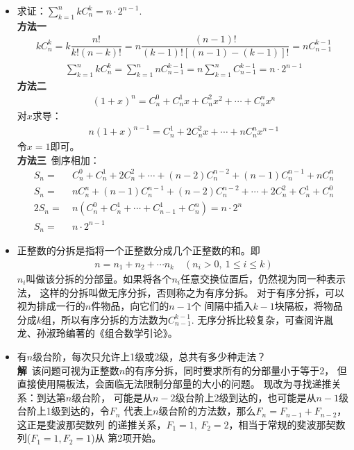 \begin{itemize}[leftmargin=\inteval{\myitemleftmargin}pt,itemsep=
   \inteval{\myitemitempsep}pt,topsep=\inteval{\myitemtopsep}pt]
\item 求证：$ \sum\limits_{k=1}^{n} kC_n^k=n\cdot2^{n-1} $. \\
\textbf{方法一} 
\begin{gather*}
    kC_n^k=k\dfrac{n!}{k!(n-k)!}=n\dfrac{(n-1)!}{(k-1)![(n-1)-(k-1)]!}=nC_{n-1}^{k-1} 	
\end{gather*}
\begin{gather*}
    \sum_{k=1}^{n} kC_n^k=\sum_{k=1}^{n} nC_{n-1}^{k-1}=n\sum_{k=1}^{n} C_{n-1}^{k-1}
    =n\cdot 2^{n-1}
\end{gather*}
\textbf{方法二}
\begin{align*}
    (1+x)^n=C_n^0+C_n^1x+C_n^2x^2+\cdots + C_n^nx^n
\end{align*}
对$ x $求导：
\begin{align} \label{二项展开式两边求导}
    n(1+x)^{n-1}=C_n^1+2C_n^2x+\cdots + nC_n^nx^{n-1}
\end{align}
令$ x=1 $即可。\\
\textbf{方法三}\ 倒序相加：
\begin{align*}
    S_n=&\ C_n^0+C_n^1+2C_n^2+\cdots+(n-2)C_n^{n-2} +(n-1)C_n^{n-1}+ nC_n^n \\
    S_n=&\ nC_n^n+(n-1)C_n^{n-1}+(n-2)C_n^{n-2}+\cdots+2C_n^2+ C_n^1 +C_n^0 \\
    2S_n=&\ n(C_n^0+C_n^1+\cdots +C_{n-1}^1+C_n^n)=n\cdot 2^n \\
    S_n=&\  n\cdot 2^{n-1}
\end{align*}

\item 正整数的分拆是指将一个正整数分成几个正整数的和。即
\begin{align*}
    n=n_1+n_2+\cdots n_k \quad (n_i>0,\ 1\leq i\leq k)
\end{align*}
$ n_i $叫做该分拆的分部量。如果将各个$ n_i $任意交换位置后，仍然视为同一种表示法，
这样的分拆叫做无序分拆，否则称之为有序分拆。
对于有序分拆，可以视为排成一行的$ n $件物品，向它们的$ n-1 $个
间隔中插入$ k-1 $块隔板，将物品分成$ k $组，所以有序分拆的方法数为$ C_{n-1}^{k-1} $. 
无序分拆比较复杂，可查阅许胤龙、孙淑玲编著的《组合数学引论》。

\item 有$ n $级台阶，每次只允许上1级或2级，总共有多少种走法？\\
\textbf{解}\ 该问题可视为正整数$ n $的有序分拆，同时要求所有的分部量小于等于2，
但直接使用隔板法，会面临无法限制分部量的大小的问题。
现改为寻找递推关系：到达第$ n $级台阶，
可能是从$ n-2 $级台阶上2级到达的，也可能是从$ n-1 $级台阶上1级到达的，令$ F_n $
代表上$ n $级台阶的方法数，那么$ F_n=F_{n-1}+F_{n-2} $，这正是斐波那契数列
的递推关系，$ F_1=1,\ F_2=2 $，相当于常规的斐波那契数列($ F_1=1,F_2=1 $)从
第2项开始。


\end{itemize}

